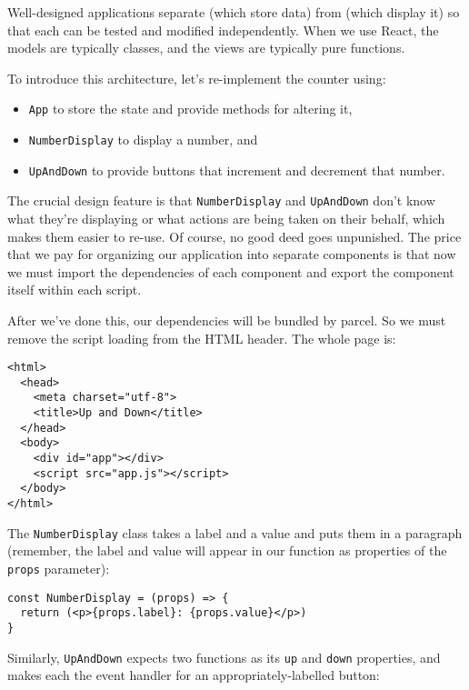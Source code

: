Well-designed applications separate  (which store data)
from  (which display it)
so that each can be tested and modified independently.
When we use React,
the models are typically classes,
and the views are typically pure functions.

To introduce this architecture,
let's re-implement the counter using:

\begin{itemize}
\item
  \texttt{App} to store the state and provide methods for altering it,
\item
  \texttt{NumberDisplay} to display a number, and
\item
  \texttt{UpAndDown} to provide buttons that increment and decrement that number.
\end{itemize}

The crucial design feature is that
\texttt{NumberDisplay} and \texttt{UpAndDown} don't know what they're displaying
or what actions are being taken on their behalf,
which makes them easier to re-use.
Of course,
no good deed goes unpunished.
The price that we pay
for organizing our application into separate components
is that now we must import the dependencies of each component
and export the component itself within each script.

After we've done this,
our dependencies will be bundled by parcel.
So we must remove the script loading from the HTML header.
The whole page is:

\begin{verbatim}
<html>
  <head>
    <meta charset="utf-8">
    <title>Up and Down</title>
  </head>
  <body>
    <div id="app"></div>
    <script src="app.js"></script>
  </body>
</html>
\end{verbatim}

The \texttt{NumberDisplay} class takes a label and a value and puts them in a paragraph
(remember, the label and value will appear in our function as properties of the \texttt{props} parameter):

\begin{verbatim}
const NumberDisplay = (props) => {
  return (<p>{props.label}: {props.value}</p>)
}
\end{verbatim}

\noindent
Similarly,
\texttt{UpAndDown} expects two functions as its \texttt{up} and \texttt{down} properties,
and makes each the event handler for an appropriately-labelled button:

